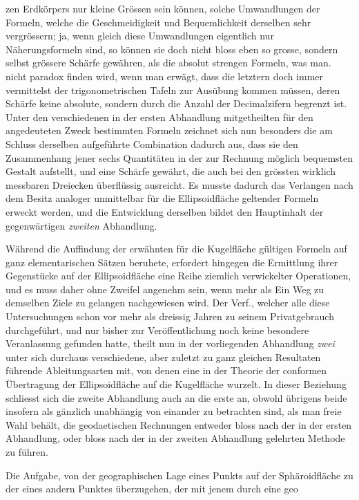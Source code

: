 %
zen Erdkörpers nur kleine Grössen sein können, solche Umwandlungen der Formeln, welche die Geschmeidigkeit und Bequemlichkeit derselben sehr vergrössern; ja, wenn gleich diese Umwandlungen eigentlich nur Näherungsformeln sind, so können sie doch nicht bloss eben so grosse, sondern selbst grössere Schärfe gewähren, als die absolut strengen Formeln, was man. nicht paradox finden wird, wenn man erwägt, dass die letztern doch immer vermittelst der trigonometrischen Tafeln zur Ausübung kommen müssen, deren Schärfe keine absolute, sondern durch die Anzahl der Decimalzifern begrenzt ist. Unter den verschiedenen in der ersten Abhandlung mitgetheilten für den angedeuteten Zweck bestimmten Formeln zeichnet sich nun besonders die am Schluss derselben aufgeführte Combination dadurch aus, dass sie den Zusammenhang jener sechs Quantitäten in der zur Rechnung möglich bequemsten Gestalt aufstellt, und eine Schärfe gewährt, die auch bei den grössten wirklich messbaren Dreiecken überflüssig ausreicht. Es musste dadurch das Verlangen nach dem Besitz analoger unmittelbar für die Ellipsoidfläche geltender Formeln erweckt werden, und die Entwicklung derselben bildet den Hauptinhalt der gegenwärtigen \textit{zweiten} Abhandlung.

Während die Auffindung der erwähnten für die Kugelfläche gültigen Formeln auf ganz elementarischen Sätzen beruhete, erfordert hingegen die Ermittlung ihrer Gegenstücke auf der Ellipsoidfläche eine Reihe ziemlich verwickelter Operationen, und es muss daher ohne Zweifel angenehm sein, wenn mehr als Ein Weg zu demselben Ziele zu gelangen nachgewiesen wird. Der Verf., welcher alle diese Untersuchungen schon vor mehr als dreissig Jahren zu seinem Privatgebrauch durchgeführt, und nur bisher zur Veröffentlichung noch keine besondere Veranlassung gefunden hatte, theilt nun in der vorliegenden Abhandlung \textit{zwei} unter sich durchaus verschiedene, aber zuletzt zu ganz gleichen Resultaten führende Ableitungsarten mit, von denen eine in der Theorie der conformen Übertragung der Ellipsoidfläche auf die Kugelfläche wurzelt. In dieser Beziehung schliesst sich die zweite Abhandlung auch an die erste an, obwohl übrigens beide insofern als gänzlich unabhängig von einander zu betrachten sind, als man freie Wahl behält, die geodaetischen Rechnungen entweder bloss nach der in der ersten Abhandlung, oder bloss nach der in der zweiten Abhandlung gelehrten Methode zu führen.

Die Aufgabe, von der geographischen Lage eines Punkts auf der Sphäroidfläche zu der eines andern Punktes überzugehen, der mit jenem durch eine geo%

